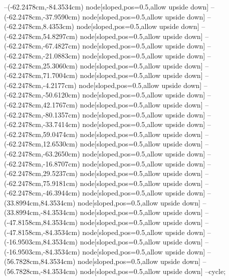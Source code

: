 --(-62.2478cm,-84.3534cm) node[sloped,pos=0.5,allow upside down]{\ArrowIn}
--(-62.2478cm,-37.9590cm) node[sloped,pos=0.5,allow upside down]{\ArrowIn}
--(-62.2478cm,8.4353cm) node[sloped,pos=0.5,allow upside down]{\ArrowIn}
--(-62.2478cm,54.8297cm) node[sloped,pos=0.5,allow upside down]{\ArrowIn}
--(-62.2478cm,-67.4827cm) node[sloped,pos=0.5,allow upside down]{\ArrowIn}
--(-62.2478cm,-21.0883cm) node[sloped,pos=0.5,allow upside down]{\ArrowIn}
--(-62.2478cm,25.3060cm) node[sloped,pos=0.5,allow upside down]{\ArrowIn}
--(-62.2478cm,71.7004cm) node[sloped,pos=0.5,allow upside down]{\ArrowIn}
--(-62.2478cm,-4.2177cm) node[sloped,pos=0.5,allow upside down]{\ArrowIn}
--(-62.2478cm,-50.6120cm) node[sloped,pos=0.5,allow upside down]{\ArrowIn}
--(-62.2478cm,42.1767cm) node[sloped,pos=0.5,allow upside down]{\ArrowIn}
--(-62.2478cm,-80.1357cm) node[sloped,pos=0.5,allow upside down]{\ArrowIn}
--(-62.2478cm,-33.7414cm) node[sloped,pos=0.5,allow upside down]{\ArrowIn}
--(-62.2478cm,59.0474cm) node[sloped,pos=0.5,allow upside down]{\ArrowIn}
--(-62.2478cm,12.6530cm) node[sloped,pos=0.5,allow upside down]{\ArrowIn}
--(-62.2478cm,-63.2650cm) node[sloped,pos=0.5,allow upside down]{\ArrowIn}
--(-62.2478cm,-16.8707cm) node[sloped,pos=0.5,allow upside down]{\ArrowIn}
--(-62.2478cm,29.5237cm) node[sloped,pos=0.5,allow upside down]{\ArrowIn}
--(-62.2478cm,75.9181cm) node[sloped,pos=0.5,allow upside down]{\ArrowIn}
--(-62.2478cm,-46.3944cm) node[sloped,pos=0.5,allow upside down]{\ArrowIn}
--(33.8994cm,84.3534cm) node[sloped,pos=0.5,allow upside down]{\ArrowIn}
--(33.8994cm,-84.3534cm) node[sloped,pos=0.5,allow upside down]{\ArrowIn}
--(-47.8158cm,84.3534cm) node[sloped,pos=0.5,allow upside down]{\ArrowIn}
--(-47.8158cm,-84.3534cm) node[sloped,pos=0.5,allow upside down]{\ArrowIn}
--(-16.9503cm,84.3534cm) node[sloped,pos=0.5,allow upside down]{\ArrowIn}
--(-16.9503cm,-84.3534cm) node[sloped,pos=0.5,allow upside down]{\ArrowIn}
--(56.7828cm,84.3534cm) node[sloped,pos=0.5,allow upside down]{\ArrowIn}
--(56.7828cm,-84.3534cm) node[sloped,pos=0.5,allow upside down]{\ArrowIn}
--cycle;
